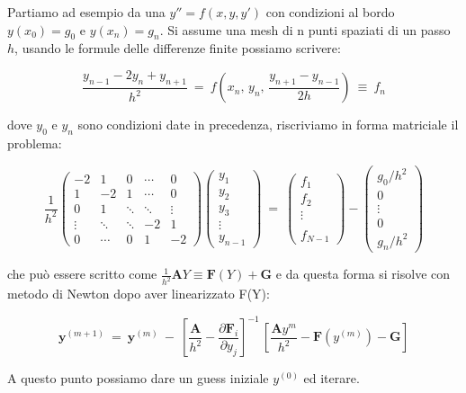 \documentclass{article}
\begin{document}
	Partiamo ad esempio da una $y''=f(x, y, y')$ con condizioni al bordo $y(x_0)=g_0$ e $y(x_n)=g_n$. Si assume una mesh di n punti spaziati di un passo $h$, usando le formule delle differenze finite possiamo scrivere:
	
	\[
	\frac{y_{n-1}-2y_n + y_{n+1}}{h^2}\ =\ f(x_n,\, y_n,\, \frac{y_{n+1}-y_{n-1}}{2h})\  \equiv\ f_n
	\]
	
	dove $y_0$ e $y_n$ sono condizioni date in precedenza, riscriviamo in forma matriciale il problema:
	
	\[ \frac{1}{h^2}
	\begin{pmatrix}
		-2 & 1 & 0 & \cdots & 0 \\
		1 & -2 & 1 & \cdots & 0 \\
		0 & 1 & \ddots & \ddots & \vdots \\
		\vdots & \ddots & \ddots & -2 & 1 \\
		0 & \cdots & 0 & 1 & -2
	\end{pmatrix}
	\begin{pmatrix}
		y_1 \\ y_2 \\ y_3 \\ \vdots \\ y_{n-1}
	\end{pmatrix}
	\ =\ \begin{pmatrix}
		f_1 \\ f_2 \\ \vdots \\ \\ f_{N-1}
	\end{pmatrix} - \begin{pmatrix}
		g_0/h^2 \\ 0 \\ \vdots \\ 0\\ g_{n}/h^2
	\end{pmatrix}
	\]
	
	che può essere scritto come $\displaystyle\frac{1}{h^2} \textbf{A}Y \equiv \textbf{F}(Y) + \textbf{G}$ e da questa forma si risolve con metodo di Newton dopo aver linearizzato F(Y):
	
	\[
	\textbf{y}^{(m+1)}\ =\ \textbf{y}^{(m)}\ -\ \left[ \frac{\textbf{A}}{h^2} - \frac{\partial \textbf{F}_i}{\partial y_j} \right]^{-1}\, \left[ \frac{\textbf{A}y^{m}}{h^2} - \textbf{F}(y^{(m)}) - \textbf{G} \right]
	\]
	
	A questo punto possiamo dare un guess iniziale $y^{(0)} $ ed iterare.
	
	
	
\end{document}
